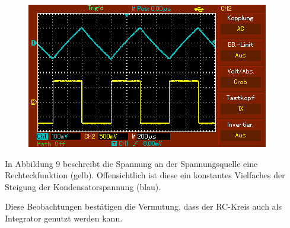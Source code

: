 	 \begin{figure}[H]
	 	\centering
	 	\caption{}
	 	\includegraphics[width=\linewidth-70pt,height=\textheight-70pt,keepaspectratio]{content/MAP004.png}
	 	\label{fig:Rechteck}
	 \end{figure}
	 In Abbildung 9 beschreibt die Spannung an der Spannungsquelle eine Rechteckfunktion (gelb). Offensichtlich ist diese ein konstantes Vielfaches der Steigung der Kondensatorspannung (blau).
	 
	 Diese Beobachtungen bestätigen die Vermutung, dass der RC-Kreis auch als Integrator genutzt werden kann.
	 
